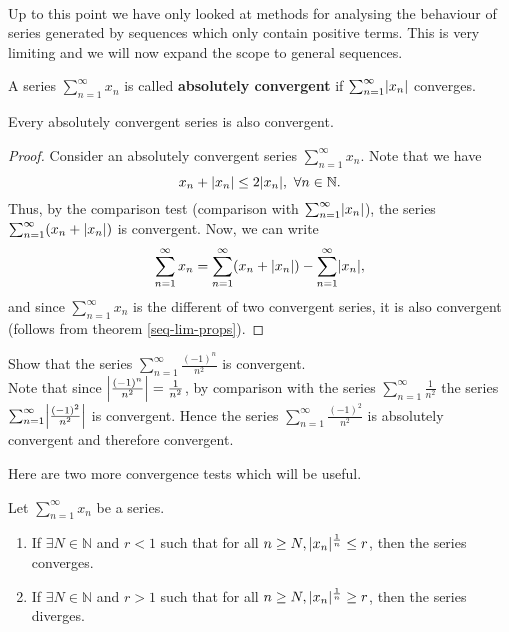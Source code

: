 \documentclass[../real_analysis.tex]{subfiles}
\begin{document}
        \paragraph{}
        Up to this point we have only looked at methods for analysing the behaviour of series generated by sequences which only contain positive terms. This is very limiting and we will now expand the scope to general sequences.
        \begin{definition}
            A series $\sum_{n=1}^\infty x_n$ is called \textbf{absolutely convergent} if $\sum_{n=1}^\infty\abs{x_n}$ converges.
        \end{definition}
        \begin{theorem}
            Every absolutely convergent series is also convergent.
        \end{theorem}
        \begin{proof}
            Consider an absolutely convergent series $\sum_{n=1}^\infty x_n$. Note that we have
            \begin{equation*}
                x_n+\abs{x_n}\leq2\abs{x_n},\ \forall n\in\mathbb{N}.
            \end{equation*}
            Thus, by the comparison test (comparison with $\sum_{n=1}^\infty\abs{x_n}$), the series $\sum_{n=1}^\infty(x_n+\abs{x_n})$ is convergent. Now, we can write
            \begin{equation*}
                \sum_{n=1}^\infty x_n=\sum_{n=1}^\infty(x_n+\abs{x_n})-\sum_{n=1}^\infty\abs{x_n},
            \end{equation*}
            and since $\sum_{n=1}^\infty x_n$ is the different of two convergent series, it is also convergent (follows from theorem \ref{seq-lim-props}).
        \end{proof}
        \begin{example}
            Show that the series $\sum_{n=1}^\infty\frac{(-1)^n}{n^2}$ is convergent.\\
            Note that since $\abs*{\frac{(-1)^n}{n^2}}=\frac{1}{n^2}$, by comparison with the series $\sum_{n=1}^\infty\frac{1}{n^2}$ the series $\sum_{n=1}^\infty\abs*{\frac{(-1)^2}{n^2}}$ is convergent. Hence the series $\sum_{n=1}^\infty\frac{(-1)^2}{n^2}$ is absolutely convergent and therefore convergent.
        \end{example}
        Here are two more convergence tests which will be useful.
        \begin{theorem}\label{root-test}
            Let $\sum_{n=1}^\infty x_n$ be a series.
            \begin{enumerate}[\upshape(i)]
                \item If $\exists N\in\mathbb{N}$ and $r<1$ such that for all $n\geq N, \abs{x_n}^\frac{1}{n}\leq r$, then the series converges.
                \item If $\exists N\in\mathbb{N}$ and $r>1$ such that for all $n\geq N, \abs{x_n}^\frac{1}{n}\geq r$, then the series diverges.
            \end{enumerate}
        \end{theorem}
\end{document}
